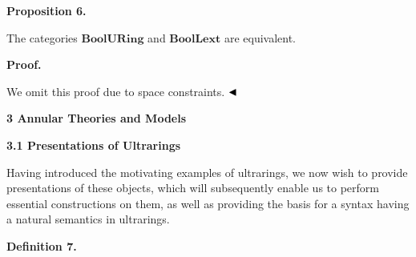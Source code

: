 \documentclass[10pt,a4paper]{amsart}
\begin{document}
 
 
\par\medskip\noindent\textbf{Proposition 6.}\par
 
 
The categories $\mathbf{BoolURing}$ and $\mathbf{BoolLext}$ are equivalent.\par
 
 
 
 
\par\medskip\noindent\textbf{Proof.}\par
 
 
We omit this proof due to space constraints. $\hfill\blacktriangleleft$\par
 
 
 
 


 
\par\medskip\noindent\textbf{3 Annular Theories and Models}\par
 
 
\par\medskip\noindent\textbf{3.1 Presentations of Ultrarings}\par
 
 
Having introduced the motivating examples of ultrarings, we now wish to provide presentations of these objects, which will subsequently enable us to perform essential constructions on them, as well as providing the basis for a syntax having a natural semantics in ultrarings.\par
 
 
 
\par\medskip\noindent\textbf{Definition 7.}\par
 
 
\end{document}
